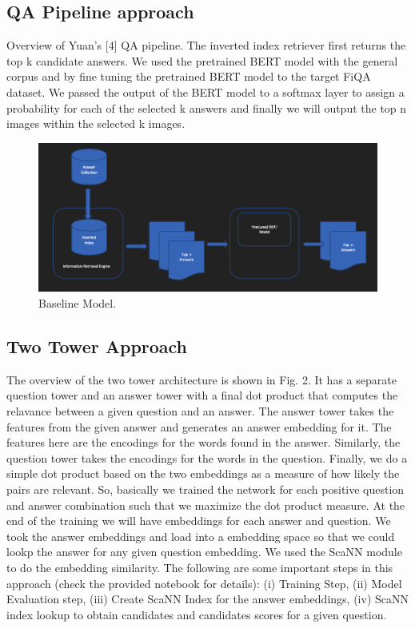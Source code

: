 \documentclass[11pt,a4paper]{article}
\begin{document}
\subsection{QA Pipeline approach}
Overview of Yuan's [4] QA pipeline. The inverted index retriever first returns the top k candidate answers. We used the pretrained BERT model with the general corpus and by fine tuning the pretrained BERT model to the target FiQA dataset. We passed the output of the BERT model to a softmax layer to assign a probability for each of the selected k answers and finally we will output the top n images within the selected k images.

\begin{figure}
  \includegraphics[width=\linewidth]{baseline.png}
  \caption{Baseline Model.}
  \label{fig:baseline model}
\end{figure}

\subsection{Two Tower Approach}
The overview of the two tower architecture is shown in Fig. 2. It has a separate question tower and an answer tower with a final dot product that computes the relavance between a given question and an answer. The answer tower takes the features from the given answer and generates an answer embedding for it. The features here are the encodings for the words found in the answer. Similarly, the question tower takes the encodings for the words in the question.  Finally, we do a simple dot product based on the two embeddings as a measure of how likely the pairs are relevant. So, basically we trained the network for each positive question and answer combination such that we maximize the dot product measure. At the end of the training we will have embeddings for each answer and question. We took the answer embeddings and load into a embedding space so that we could lookp the answer for any given question embedding. We used the ScaNN module to do the embedding similarity. The following are some important steps in this approach (check the provided notebook for details): (i) Training Step,  (ii) Model Evaluation step, (iii) Create ScaNN Index for the answer embeddings, (iv) ScaNN index lookup to obtain candidates and candidates scores for a given question. 
\end{document}
